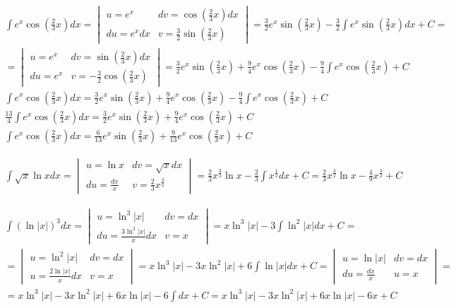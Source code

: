 \begin{gather*}
  \int e^x\cos (\tfrac{2}{3}x)dx =
  \begin{vmatrix}
    u=e^x & dv=\cos(\tfrac{2}{3}x)dx \\
    du=e^x dx & v=\frac{3}{2}\sin (\tfrac{2}{3}x)
  \end{vmatrix}
  = \frac{3}{2}e^x\sin (\tfrac{2}{3}x) - \frac{3}{2} \int e^x\sin (\tfrac{2}{3}x)dx + C = \\
  = \begin{vmatrix}
    u=e^x & dv=\sin (\tfrac{2}{3}x)dx \\
    du=e^x & v=-\frac{3}{2}\cos(\tfrac{2}{3}x)
  \end{vmatrix}
  = \frac{3}{2}e^x\sin (\tfrac{2}{3}x) + \frac{9}{4}e^x\cos(\tfrac{2}{3}x) - \frac{9}{4}\int e^x\cos(\tfrac{2}{3}x) + C \\
  \int e^x\cos (\tfrac{2}{3}x)dx = \frac{3}{2}e^x\sin (\tfrac{2}{3}x) + \frac{9}{4}e^x\cos(\tfrac{2}{3}x) - \frac{9}{4}\int e^x\cos(\tfrac{2}{3}x) + C \\
  \frac{13}{4}\int e^x\cos (\tfrac{2}{3}x)dx = \frac{3}{2}e^x\sin (\tfrac{2}{3}x) + \frac{9}{4}e^x\cos(\tfrac{2}{3}x) + C \\
  \int e^x\cos (\tfrac{2}{3}x)dx = \frac{6}{13}e^x\sin (\tfrac{2}{3}x) + \frac{9}{13}e^x\cos(\tfrac{2}{3}x) + C
\end{gather*}



\begin{gather*}
  \int \sqrt{x}\ln x dx =
  \begin{vmatrix}
    u=\ln x & dv=\sqrt{x}dx \\
    du=\frac{dx}{x} & v=\frac{2}{3}x^{\frac{3}{2}}
  \end{vmatrix}
  = \frac{2}{3}x^{\frac{3}{2}}\ln x - \frac{2}{3} \int x^{\frac{1}{2}}dx + C
  = \frac{2}{3}x^{\frac{3}{2}}\ln x - \frac{4}{9} x^{\frac{3}{2}} + C
\end{gather*}



\begin{gather*}
  \int (\ln|x|)^3 dx =
  \begin{vmatrix}
    u=\ln^3|x| & dv=dx \\
    du=\frac{3\ln^2|x|}{x}dx & v=x
  \end{vmatrix}
  = x\ln^3|x| - 3\int \ln^2|x|dx + C = \\
  = \begin{vmatrix}
    u= \ln^2|x| & dv=dx \\
    u=\frac{2\ln|x|}{x}dx & v=x
  \end{vmatrix}
  = x\ln^3|x| - 3x\ln^2|x| + 6\int \ln|x|dx + C =
  \begin{vmatrix}
    u=\ln|x| & dv=dx \\
    du=\frac{dx}{x} & u=x
  \end{vmatrix} = \\
  = x\ln^3|x| - 3x\ln^2|x| + 6x\ln|x| - 6\int dx + C
  = x\ln^3|x| - 3x\ln^2|x| + 6x\ln|x| - 6x + C
\end{gather*}


